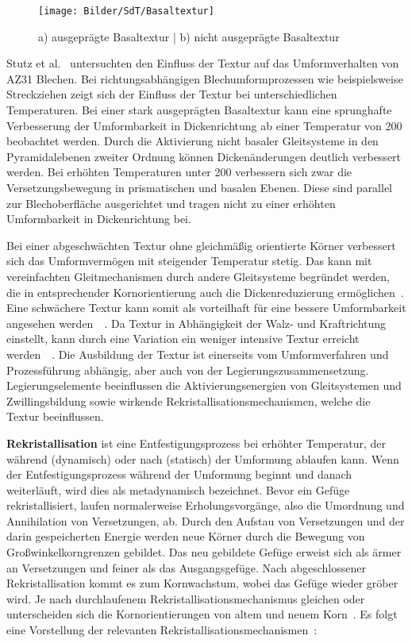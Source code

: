 \begin{figure}[H]%
    \centering
    \texttt{[image: Bilder/SdT/Basaltextur]}
    \caption[Ausgeprägte und nicht ausgeprägte Basaltextur]{a) ausgeprägte Basaltextur | b) nicht ausgeprägte Basaltextur~\cite{Ullmann2019}}
    \label{fig:basaltextur}
\end{figure}

Stutz et al.~\cite{Stutz.2015} untersuchten den Einfluss der Textur auf das Umformverhalten von AZ31 Blechen.
Bei richtungsabhängigen Blechumformprozessen wie beispielsweise Streckziehen zeigt sich der Einfluss der Textur bei unterschiedlichen Temperaturen.
Bei einer stark ausgeprägten Basaltextur kann eine sprunghafte Verbesserung der Umformbarkeit in Dickenrichtung ab einer Temperatur von \SI{200}{\dC} beobachtet werden.
Durch die Aktivierung nicht basaler Gleitsysteme in den Pyramidalebenen zweiter Ordnung können Dickenänderungen deutlich verbessert werden.
Bei erhöhten Temperaturen unter \SI{200}{\dC} verbessern sich zwar die Versetzungsbewegung in prismatischen und basalen Ebenen.
Diese sind parallel zur Blechoberfläche ausgerichtet und tragen nicht zu einer erhöhten Umformbarkeit in Dickenrichtung bei.

Bei einer abgeschwächten Textur ohne gleichmäßig orientierte Körner verbessert sich das Umformvermögen mit steigender Temperatur stetig.
Das kann mit vereinfachten Gleitmechanismen durch andere Gleitsysteme begründet werden, die in entsprechender Kornorientierung auch die Dickenreduzierung ermöglichen~\cite{Stutz2015}.
Eine schwächere Textur kann somit als vorteilhaft für eine bessere Umformbarkeit angesehen werden~\cite{Bettles2005,Yukutake2003}~.
Da Textur in Abhängigkeit der Walz- und Kraftrichtung einstellt, kann durch eine Variation ein weniger intensive Textur erreicht werden~\cite{Chino2007}~.
Die Ausbildung der Textur ist einerseits vom Umformverfahren und Prozessführung abhängig, aber auch von der Legierungszusammensetzung.
Legierungselemente beeinflussen die Aktivierungsenergien von Gleitsystemen und Zwillingsbildung sowie wirkende Rekristallisationsmechanismen, welche die Textur beeinflussen.


\textbf{Rekristallisation} ist eine Entfestigungsprozess bei erhöhter Temperatur, der während (dynamisch) oder nach (statisch) der Umformung ablaufen kann.
Wenn der Entfestigungsprozess während der Umformung beginnt und danach weiterläuft, wird dies als metadynamisch bezeichnet.
Bevor ein Gefüge rekristallisiert, laufen normalerweise Erholungsvorgänge, also die Umordnung und Annihilation von Versetzungen, ab.
Durch den Aufstau von Versetzungen und der darin gespeicherten Energie werden neue Körner durch die Bewegung von Großwinkelkorngrenzen gebildet.
Das neu gebildete Gefüge erweist sich als ärmer an Versetzungen und feiner als das Ausgangsgefüge.
Nach abgeschlossener Rekristallisation kommt es zum Kornwachstum, wobei das Gefüge wieder gröber wird.
Je nach durchlaufenem Rekristallisationsmechanismus gleichen oder unterscheiden sich die Kornorientierungen von altem und neuem Korn~\cite{Ullmann2014}.
Es folgt eine Vorstellung der relevanten Rekristallisationsmechanismen~\cite{Kittner.2019}:

